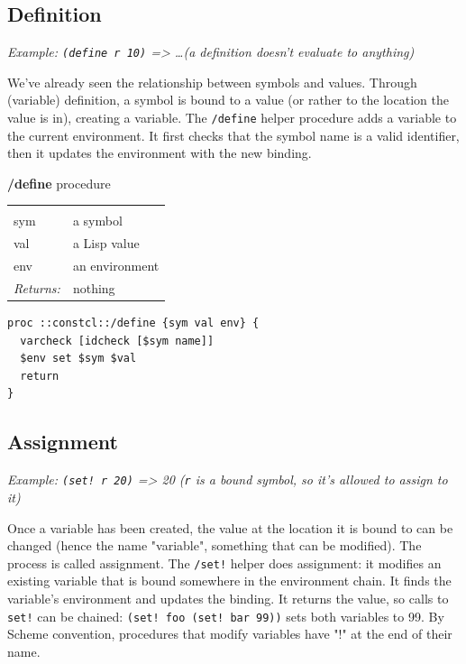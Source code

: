 \documentclass[twoside,9pt]{report}
\begin{document}
\subsection{Definition}
\label{definition}


\emph{Example: \texttt{(define r 10)} => \ldots  (a definition doesn't evaluate to anything)}


We've already seen the relationship between symbols and values. Through (variable) definition, a symbol is bound to a value (or rather to the location the value is in), creating a variable. The \texttt{/define} helper procedure adds a variable to the current environment. It first checks that the symbol name is a valid identifier, then it updates the environment with the new binding.


\textbf{/define} procedure

\noindent\begin{tabular}{ |p{1.5cm} p{8cm}| }
\hline
\rowcolor[HTML]{CCCCCC} \multicolumn{2}{|l|}{\bf /define (internal)} \\
sym & a symbol \\
val & a Lisp value \\
env & an environment \\
\textit{Returns:} & nothing \\
\hline
\end{tabular}
\begin{lstlisting}
proc ::constcl::/define {sym val env} {
  varcheck [idcheck [$sym name]]
  $env set $sym $val
  return
}
\end{lstlisting}
\subsection{Assignment}
\label{assignment}


\emph{Example: \texttt{(set! r 20)} => 20 (\texttt{r} is a bound symbol, so it's allowed to assign to it)}


Once a variable has been created, the value at the location it is bound to can be changed (hence the name "variable", something that can be modified). The process is called assignment. The \texttt{/set!} helper does assignment: it modifies an existing variable that is bound somewhere in the environment chain. It finds the variable's environment and updates the binding. It returns the value, so calls to \texttt{set!} can be chained: \texttt{(set! foo (set! bar 99))} sets both variables to 99. By Scheme convention, procedures that modify variables have "!" at the end of their name.
\end{document}
